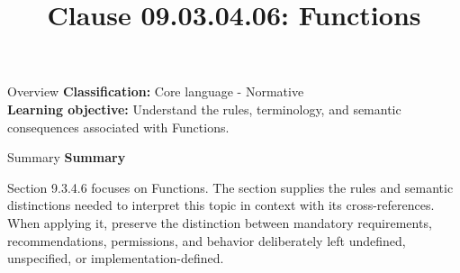 \documentclass[10pt,letterpaper]{article}
\title{Clause 09.03.04.06: Functions}
\author{}
\date{}
\begin{document}
\maketitle
\begin{CornellOverviewBox}{Overview}
\textbf{Classification:} Core language - Normative\\[2pt]
\textbf{Learning objective:} Understand the rules, terminology, and semantic consequences associated with Functions.
\end{CornellOverviewBox}\begin{CornellSummaryBox}{Summary}
{\sffamily\bfseries\color{Accent} Summary}\par\vspace{3pt}Section 9.3.4.6 focuses on Functions. The section supplies the rules and semantic distinctions needed to interpret this topic in context with its cross-references. When applying it, preserve the distinction between mandatory requirements, recommendations, permissions, and behavior deliberately left undefined, unspecified, or implementation-defined.
\end{CornellSummaryBox}
\end{document}

